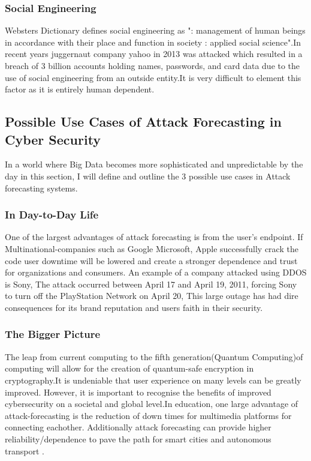 \documentclass[journal]{IEEEtran}
\begin{document}
\subsubsection{Social Engineering}
Websters Dictionary defines social engineering as ": management of human beings in accordance with their place and function in society : applied social science".In recent years juggernaut company yahoo in 2013 was attacked which resulted in a breach of 3 billion accounts holding names, passwords, and card data due to the use of social engineering from an outside entity.It is very difficult to element this factor as it is entirely human dependent.

\subsection{Possible Use Cases of Attack  Forecasting in 
Cyber  Security}
In a world where Big Data becomes more sophisticated and unpredictable by the day in this section, I will define and outline the 3 possible use cases in Attack forecasting systems.
\subsubsection{In Day-to-Day  Life}
One of the largest advantages of attack forecasting is from the user's endpoint. If Multinational-companies such as Google Microsoft, Apple successfully crack the code user downtime will be lowered and create a stronger dependence and trust for organizations and consumers. An example of a company attacked using DDOS is Sony, The attack occurred between April 17 and April 19, 2011, forcing Sony to turn off the PlayStation Network on April 20, This large outage has had dire consequences for its brand reputation and users faith in their security.

\subsubsection{The Bigger Picture}
The leap from current computing to the fifth generation(Quantum Computing)of computing will allow for the creation of quantum-safe encryption in cryptography.It  is undeniable that  user experience on many levels can  be greatly improved. However, it is important to recognise the benefits of improved  cybersecurity on a societal and global level.In education, one large advantage of attack-forecasting is the reduction of down times for multimedia platforms for connecting eachother. Additionally attack forecasting can provide higher reliability/dependence to pave the path for smart cities and autonomous transport .
\end{document}

